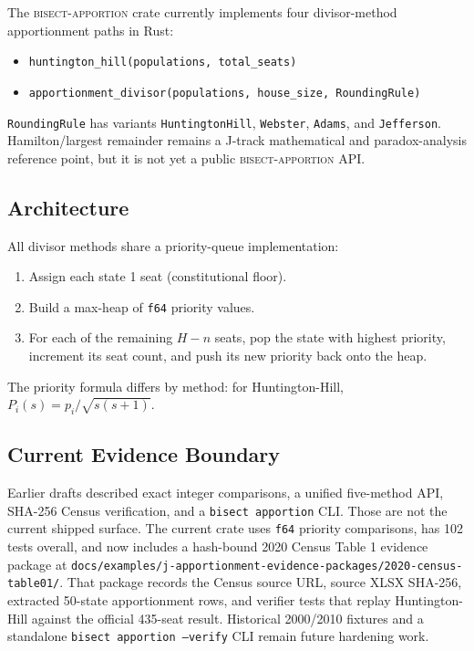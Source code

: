 \label{sec:implementation}

The \textsc{bisect-apportion} crate currently implements four divisor-method
apportionment paths in Rust:

\begin{itemize}
  \item \texttt{huntington\_hill(populations, total\_seats)}
  \item \texttt{apportionment\_divisor(populations, house\_size, RoundingRule)}
\end{itemize}

\noindent
\texttt{RoundingRule} has variants \texttt{HuntingtonHill}, \texttt{Webster},
\texttt{Adams}, and \texttt{Jefferson}.  Hamilton/largest remainder remains a
J-track mathematical and paradox-analysis reference point, but it is not yet a
public \textsc{bisect-apportion} API.

\subsection{Architecture}

All divisor methods share a priority-queue implementation:
\begin{enumerate}
  \item Assign each state 1 seat (constitutional floor).
  \item Build a max-heap of \texttt{f64} priority values.
  \item For each of the remaining $H - n$ seats, pop the state with
    highest priority, increment its seat count, and push its new
    priority back onto the heap.
\end{enumerate}
The priority formula differs by method:
for Huntington-Hill, $P_i(s) = p_i/\sqrt{s(s+1)}$.

\subsection{Current Evidence Boundary}

Earlier drafts described exact integer comparisons, a unified five-method API,
SHA-256 Census verification, and a \texttt{bisect apportion} CLI.  Those are not
the current shipped surface.  The current crate uses \texttt{f64} priority
comparisons, has 102 tests overall, and now includes a hash-bound 2020 Census
Table 1 evidence package at
\texttt{docs/examples/j-apportionment-evidence-packages/2020-census-table01/}.
That package records the Census source URL, source XLSX SHA-256, extracted
50-state apportionment rows, and verifier tests that replay Huntington-Hill
against the official 435-seat result.  Historical 2000/2010 fixtures and a
standalone \texttt{bisect apportion --verify} CLI remain future hardening work.
